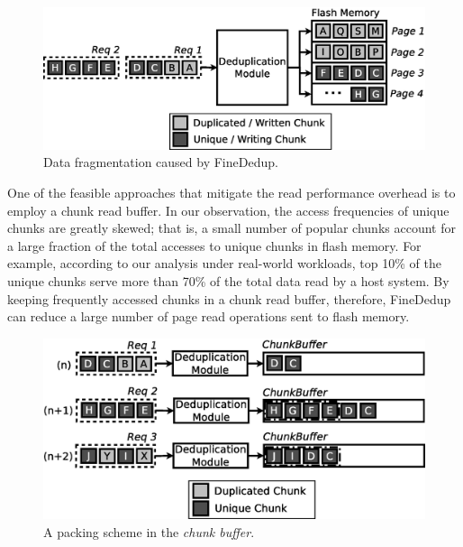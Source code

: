\begin{figure}[t]
	\center
	\includegraphics[scale=0.4]{figure/finededup/readoverhead}
	\caption{Data fragmentation caused by FineDedup.} %
	\label{fig:readoverhead}
\end{figure}


One of the feasible approaches that mitigate the read performance overhead is to employ a chunk read buffer.
In our observation, 
the access frequencies of unique chunks are greatly skewed;
that is, a small number of popular chunks account for a large fraction of the total accesses to unique chunks in flash memory.
For example, according to our analysis under real-world workloads, 
top 10\% of the unique chunks serve more than 70\% of the total data read by a host system.
By keeping frequently accessed chunks in a chunk read buffer,
therefore, FineDedup can reduce a large number of page read operations sent to flash memory.

\begin{figure}[t]
	\center
	\includegraphics[scale=0.4]{figure/finededup/chunkbuffer}
	\caption{A packing scheme in the \textit{chunk buffer}.} %
	\label{fig:chunkbuffer}
\end{figure}

